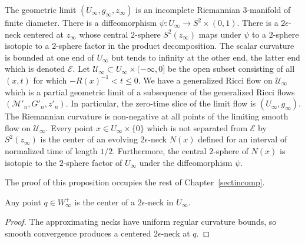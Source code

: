 \begin{proposition}
\label{prop:incomplete-limit-tube-properties}
\label{Uinfty}

The geometric limit $(U_\infty,g_\infty,z_\infty)$ is an incomplete
Riemannian $3$-manifold of finite diameter. There is a
diffeomorphism $\psi\colon U_\infty\to S^2\times (0,1)$. There is a
$2\epsilon$-neck centered at $z_\infty$ whose central $2$-sphere
$S^2(z_\infty)$ maps under $\psi$ to a $2$-sphere isotopic to a
$2$-sphere  factor in the product decomposition. The scalar
curvature is bounded at one end of $U_\infty$ but tends to infinity
at the other end, the latter end  which is denoted ${\mathcal E}$.
Let ${\mathcal U}_\infty\subset U_\infty\times(-\infty,0]$ be the
open subset consisting of all $(x,t)$ for which $-R(x)^{-1}<t\le 0$.
We have a generalized Ricci flow on ${\mathcal U}_\infty$ which is a
partial geometric limit of a subsequence of the generalized Ricci
flows $({\mathcal M}'_n,G'_n,z'_n)$. In particular, the zero-time
slice of the limit flow is $(U_\infty,g_\infty)$. The Riemannian
curvature is non-negative at all points of the limiting smooth flow
on ${\mathcal U}_\infty$. Every point $x\in U_\infty\times\{0\}$
which is not separated from ${\mathcal E}$ by $S^2(z_\infty)$ is the
center of an evolving $2\epsilon$-neck $N(x)$ defined for an
interval of normalized time of length $1/2$. Furthermore, the
central $2$-sphere of $N(x)$ is isotopic to the $2$-sphere factor of
$U_\infty$ under the diffeomorphism $\psi$.
\end{proposition}


The proof of this proposition occupies the rest of
Chapter~\ref{sectincomp}.

\begin{claim}
\label{claim:points-in-Wplus-are-neck-centers}
Any point $q\in W^+_\infty$ is the center of a $2\epsilon$-neck in
$U_\infty$.
\end{claim}
\begin{proof}
\sketch The approximating necks have uniform regular curvature bounds,
so smooth convergence produces a centered $2\epsilon$-neck at $q$.
\end{proof}

